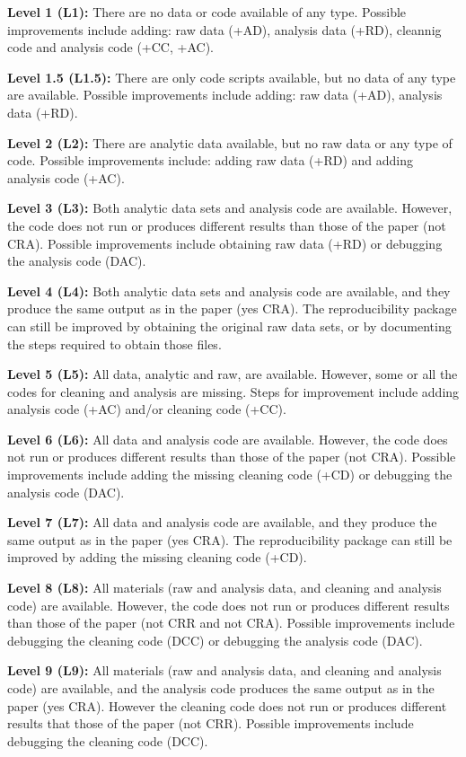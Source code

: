 \documentclass[]{book}
\begin{document}
\textbf{Level 1 (L1):} There are no data or code available of any type. Possible improvements include adding: raw data (+AD), analysis data (+RD), cleannig code and analysis code (+CC, +AC).

\textbf{Level 1.5 (L1.5):} There are only code scripts available, but no data of any type are available. Possible improvements include adding: raw data (+AD), analysis data (+RD).

\textbf{Level 2 (L2):} There are analytic data available, but no raw data or any type of code. Possible improvements include: adding raw data (+RD) and adding analysis code (+AC).

\textbf{Level 3 (L3):} Both analytic data sets and analysis code are available. However, the code does not run or produces different results than those of the paper (not CRA). Possible improvements include obtaining raw data (+RD) or debugging the analysis code (DAC).

\textbf{Level 4 (L4):} Both analytic data sets and analysis code are available, and they produce the same output as in the paper (yes CRA). The reproducibility package can still be improved by obtaining the original raw data sets, or by documenting the steps required to obtain those files.

\textbf{Level 5 (L5):} All data, analytic and raw, are available. However, some or all the codes for cleaning and analysis are missing. Steps for improvement include adding analysis code (+AC) and/or cleaning code (+CC).

\textbf{Level 6 (L6):} All data and analysis code are available. However, the code does not run or produces different results than those of the paper (not CRA). Possible improvements include adding the missing cleaning code (+CD) or debugging the analysis code (DAC).

\textbf{Level 7 (L7):} All data and analysis code are available, and they produce the same output as in the paper (yes CRA). The reproducibility package can still be improved by adding the missing cleaning code (+CD).

\textbf{Level 8 (L8):} All materials (raw and analysis data, and cleaning and analysis code) are available. However, the code does not run or produces different results than those of the paper (not CRR and not CRA). Possible improvements include debugging the cleaning code (DCC) or debugging the analysis code (DAC).

\textbf{Level 9 (L9):} All materials (raw and analysis data, and cleaning and analysis code) are available, and the analysis code produces the same output as in the paper (yes CRA). However the cleaning code does not run or produces different results that those of the paper (not CRR). Possible improvements include debugging the cleaning code (DCC).
\end{document}
